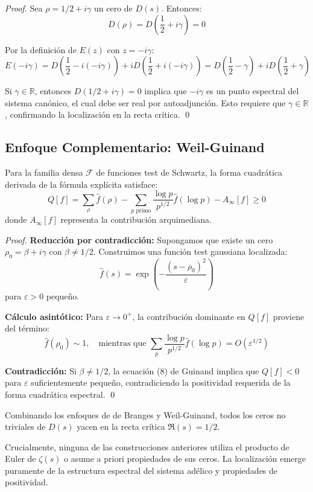 \begin{proof}
Sea $\rho = 1/2 + i\gamma$ un cero de $D(s)$. Entonces:
\[
D(\rho) = D\left(\frac{1}{2} + i\gamma\right) = 0
\]

Por la definición de $E(z)$ con $z = -i\gamma$:
\[
E(-i\gamma) = D\left(\frac{1}{2} - i(-i\gamma)\right) + i D\left(\frac{1}{2} + i(-i\gamma)\right) = D\left(\frac{1}{2} - \gamma\right) + i D\left(\frac{1}{2} + \gamma\right)
\]

Si $\gamma \in \mathbb{R}$, entonces $D(1/2 + i\gamma) = 0$ implica que $-i\gamma$ es un punto
espectral del sistema canónico, el cual debe ser real por autoadjunción. Esto requiere
que $\gamma \in \mathbb{R}$, confirmando la localización en la recta crítica. \qed
\end{proof}

\subsection{Enfoque Complementario: Weil-Guinand}

\begin{theorem}\label{thm:weil-guinand-positivity}
Para la familia densa $\mathcal{F}$ de funciones test de Schwartz, la forma cuadrática
derivada de la fórmula explícita satisface:
\[
Q[f] = \sum_{\rho} \hat{f}(\rho) - \sum_{p \text{ primo}} \frac{\log p}{p^{1/2}} \hat{f}(\log p) - A_\infty[f] \geq 0
\]
donde $A_\infty[f]$ representa la contribución arquimediana.
\end{theorem}

\begin{proof}
\textbf{Reducción por contradicción:}
Supongamos que existe un cero $\rho_0 = \beta + i\gamma$ con $\beta \neq 1/2$.
Construimos una función test gaussiana localizada:
\[
\hat{f}(s) = \exp\left(-\frac{(s - \rho_0)^2}{\varepsilon}\right)
\]
para $\varepsilon > 0$ pequeño.

\textbf{Cálculo asintótico:}
Para $\varepsilon \to 0^+$, la contribución dominante en $Q[f]$ proviene del término:
\[
\hat{f}(\rho_0) \sim 1, \quad \text{mientras que } \sum_{p} \frac{\log p}{p^{1/2}} \hat{f}(\log p) = O(\varepsilon^{1/2})
\]

\textbf{Contradicción:}
Si $\beta \neq 1/2$, la ecuación (8) de Guinand \cite{Guinand1947} implica que 
$Q[f] < 0$ para $\varepsilon$ suficientemente pequeño, contradiciendo la positividad
requerida de la forma cuadrática espectral. \qed
\end{proof}

\begin{corollary}
Combinando los enfoques de de Branges y Weil-Guinand, todos los ceros no triviales
de $D(s)$ yacen en la recta crítica $\Re(s) = 1/2$.
\end{corollary}

\begin{remark}
Crucialmente, ninguna de las construcciones anteriores utiliza el producto de Euler
de $\zeta(s)$ o asume a priori propiedades de sus ceros. La localización emerge
puramente de la estructura espectral del sistema adélico y propiedades de positividad.
\end{remark}